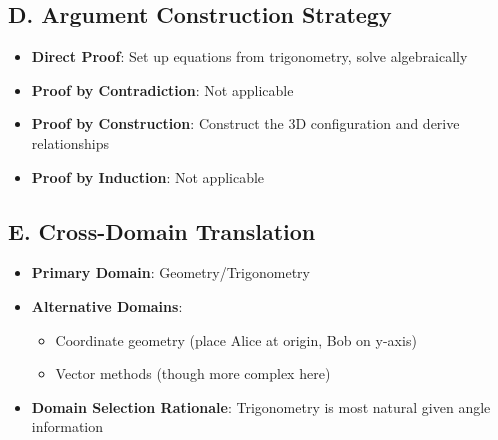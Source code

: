 \documentclass[12pt]{article}
\begin{document}
\begin{strategicbox}
\subsection*{D. Argument Construction Strategy}
\begin{itemize}[leftmargin=*]
    \item \textbf{Direct Proof}: Set up equations from trigonometry, solve algebraically
    \item \textbf{Proof by Contradiction}: Not applicable
    \item \textbf{Proof by Construction}: Construct the 3D configuration and derive relationships
    \item \textbf{Proof by Induction}: Not applicable
\end{itemize}

\subsection*{E. Cross-Domain Translation}
\begin{itemize}[leftmargin=*]
    \item \textbf{Primary Domain}: Geometry/Trigonometry
    \item \textbf{Alternative Domains}: 
    \begin{itemize}
        \item Coordinate geometry (place Alice at origin, Bob on y-axis)
        \item Vector methods (though more complex here)
    \end{itemize}
    \item \textbf{Domain Selection Rationale}: Trigonometry is most natural given angle information
\end{itemize}
\end{strategicbox}
\end{document}
